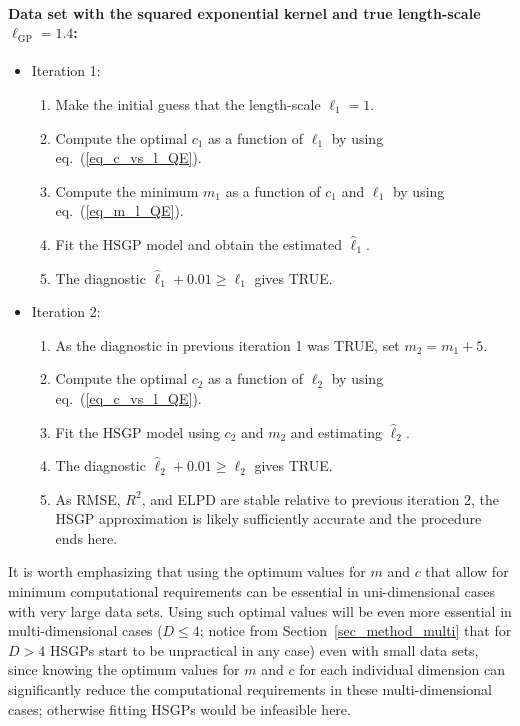 \paragraph*{Data set with the squared exponential kernel and true length-scale $\ell_{\text{GP}} = 1.4$:} 
\begin{itemize}
\item[] Iteration 1:
	\begin{enumerate}
	\item Make the initial guess that the length-scale $\ell_1=1$.
	
	\item Compute the optimal $c_1$ as a function of $\ell_1$ by using eq.~(\ref{eq_c_vs_l_QE}).
	
	\item Compute the minimum $m_1$ as a function of $c_1$ and $\ell_1$ by using eq.~(\ref{eq_m_l_QE}).
	
	\item Fit the HSGP model and obtain the estimated $\hat{\ell}_1$.
	
	\item The diagnostic $\hat{\ell}_1 + 0.01 \geq \ell_1$ gives TRUE.
	\end{enumerate}
	
\item[] Iteration 2:
	\begin{enumerate}
	\item As the diagnostic in previous iteration 1 was TRUE, set $m_2 = m_1 + 5$.
	
	\item Compute the optimal $c_2$ as a function of $\ell_2$ by using eq.~(\ref{eq_c_vs_l_QE}).
	
	\item Fit the HSGP model using $c_2$ and $m_2$ and estimating $\hat{\ell}_2$.
	
	\item The diagnostic $\hat{\ell}_2 + 0.01 \geq \ell_2$ gives TRUE.
	
	\item As RMSE, $R^2$, and ELPD are stable relative to previous iteration 2, the HSGP approximation is likely sufficiently accurate and the procedure ends here.
	\end{enumerate}
	
\end{itemize} 

It is worth emphasizing that using the optimum values for $m$ and $c$ that allow for minimum computational requirements can be essential in uni-dimensional cases with very large data sets. Using such optimal values will be even more essential in multi-dimensional cases ($D \leq 4$; notice from Section~\ref{sec_method_multi} that for $D > 4$ HSGPs start to be unpractical in any case) even with small data sets, since knowing the optimum values for $m$ and $c$ for each individual dimension can significantly reduce the computational requirements in these multi-dimensional cases; otherwise fitting HSGPs would be infeasible here.

